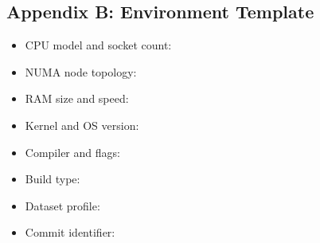 \documentclass[
  english,
  letterpaper,
  DIV=11,
  numbers=noendperiod]{scrartcl}
\providecommand{\tightlist}{%
  \setlength{\itemsep}{0pt}\setlength{\parskip}{0pt}}
\begin{document}
\subsection{Appendix B: Environment
Template}\label{appendix-b-environment-template}

\begin{itemize}
\tightlist
\item
  CPU model and socket count:
\item
  NUMA node topology:
\item
  RAM size and speed:
\item
  Kernel and OS version:
\item
  Compiler and flags:
\item
  Build type:
\item
  Dataset profile:
\item
  Commit identifier:
\end{itemize}
\end{document}
